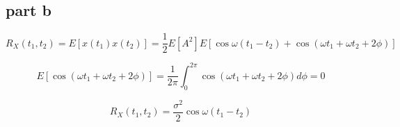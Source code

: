 \subsection{part b}
$$
R_X(t_1, t_2) = E[x(t_1)x(t_2)] = \dfrac{1}{2} E[A^2]E[\cos\omega(t_1-t_2)+\cos(\omega t_1 + \omega t_2 + 2\phi)]
$$

$$
E[\cos(\omega t_1 + \omega t_2 + 2\phi)] = \dfrac{1}{2\pi}\int_0^{2\pi} \cos(\omega t_1 + \omega t_2 + 2\phi)d\phi = 0
$$

$$
R_X(t_1, t_2) = \dfrac{\sigma^2}{2}\cos\omega(t_1-t_2)
$$